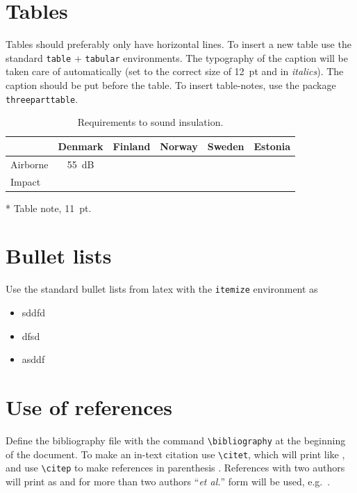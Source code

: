\documentclass[unicode-math]{interarticle}
\newcommand\comm[1]{\texttt{\textbackslash #1}}
\begin{document}
\section{Tables}
Tables should preferably only have horizontal lines.
To insert a new table use the standard \texttt{table} + \texttt{tabular} environments.
The typography of the caption will be taken care of automatically (set to the correct size of \SI{12}{pt} and in \textit{italics}).
The caption should be put before the table.
To insert table-notes, use the package \texttt{threeparttable}.

\begin{table}[htb]
  \small
  \caption{Requirements to sound insulation.}%
  \label{tab:table1}
  \begin{threeparttable}
    \begin{tabular}{lccccc}\toprule
      & Denmark     & Finland & Norway & Sweden & Estonia \\\midrule
      Airborne & \SI{55}{dB}\tnote{*} &         &        &        &         \\
      Impact   &             &         &        &        &         \\\bottomrule
    \end{tabular}
  \begin{tablenotes}
  \item[*] Table note, \SI{11}{pt}.
  \end{tablenotes}
  \end{threeparttable}
\end{table}

\section{Bullet lists}
Use the standard bullet lists from latex with the \texttt{itemize} environment as
\begin{itemize}
  \item sddfd
  \item dfsd
  \item asddf
\end{itemize}

\section{Use of references}
Define the bibliography file with the command \comm{bibliography} at the beginning of the document.
To make an in-text citation use \comm{citet}, which will print like \citet{Isaksson1999}, and use \comm{citep} to make references in parenthesis \citep{Isaksson1999}.
References with two authors will print as \citet{Taylor1991} and for more than two authors ``\emph{et al.}'' form will be used, e.g.\ \citet{Showalter1987}.\par
\end{document}
